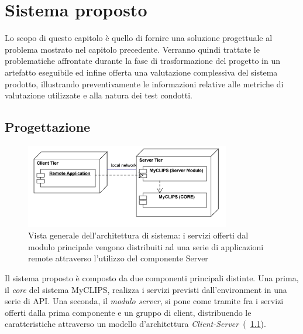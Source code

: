 \chapter{Sistema proposto}

Lo scopo di questo capitolo è quello di fornire una soluzione progettuale al problema mostrato nel capitolo precedente. Verranno quindi trattate le problematiche affrontate durante la fase di trasformazione del progetto in un artefatto eseguibile ed infine offerta una valutazione complessiva del sistema prodotto, illustrando preventivamente le informazioni relative alle metriche di valutazione utilizzate e alla natura dei test condotti.

\section{Progettazione}

\begin{figure}[h]
\centering
\includegraphics[width=0.8\textwidth]{Immagini/Capitolo3/Deployment/Client-Server.png}
\caption[Vista generale dell'architettura di sistema]{Vista generale dell'architettura di sistema: i servizi offerti dal modulo principale vengono distribuiti ad una serie di applicazioni remote attraverso l'utilizzo del componente Server}\label{fig:architettura-client-server}
\end{figure}

Il sistema proposto è composto da due componenti principali distinte. Una prima, il \emph{core} del sistema MyCLIPS, realizza i servizi previsti dall'environment in una serie di API. Una seconda, il \emph{modulo server}, si pone come tramite fra i servizi offerti dalla prima componente e un gruppo di client, distribuendo le caratteristiche attraverso un modello d'architettura \emph{Client-Server}~(\figurename~\ref{fig:architettura-client-server}).


